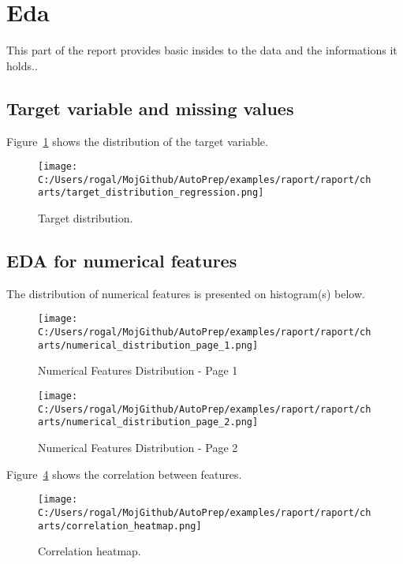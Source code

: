 \documentclass{article}%
\begin{document}
%
\section{Eda}%
\label{sec:Eda}%

%
This part of the report provides basic insides to the data and the informations it holds..%
\subsection{Target variable and missing values}%
\label{subsec:Targetvariableandmissingvalues}%

%
Figure~\ref{Target distribution.} %
 shows the distribution of the target variable.%


\begin{figure}[H]%
\centering%
\texttt{[image: C:/Users/rogal/MojGithub/AutoPrep/examples/raport/raport/charts/target\_distribution\_regression.png]}%
\caption{Target distribution.}%
\label{Target distribution.}%
\end{figure}

%
\subsection{EDA for numerical features}%
\label{subsec:EDAfornumericalfeatures}%

%
The distribution of numerical features is presented on histogram(s) below.%


\begin{figure}[H]%
\centering%
\texttt{[image: C:/Users/rogal/MojGithub/AutoPrep/examples/raport/raport/charts/numerical\_distribution\_page\_1.png]}%
\caption{Numerical Features Distribution {-} Page 1}%
\label{Numerical Features Distribution - Page 1}%
\end{figure}

%


\begin{figure}[H]%
\centering%
\texttt{[image: C:/Users/rogal/MojGithub/AutoPrep/examples/raport/raport/charts/numerical\_distribution\_page\_2.png]}%
\caption{Numerical Features Distribution {-} Page 2}%
\label{Numerical Features Distribution - Page 2}%
\end{figure}

%
Figure~\ref{Correlation heatmap.} %
 shows the correlation between features.%


\begin{figure}[H]%
\centering%
\texttt{[image: C:/Users/rogal/MojGithub/AutoPrep/examples/raport/raport/charts/correlation\_heatmap.png]}%
\caption{Correlation heatmap.}%
\label{Correlation heatmap.}%
\end{figure}
\end{document}
